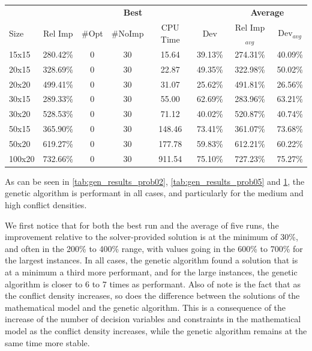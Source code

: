 \documentclass{mimosis}
\begin{document}
\begin{table}[h]
\begin{tabular}{lccccc|cc}
\multicolumn{1}{c}{} & \multicolumn{5}{c}{\textbf{Best}} & \multicolumn{2}{c}{\textbf{Average}} \\
\cmidrule(lr){2-6}\cmidrule(lr){7-8}
Size & Rel Imp & \#Opt & \#NoImp & CPU Time & Dev & Rel Imp$_{avg}$ & Dev$_{avg}$ \\
\hline
15x15 & 280.42\% & 0 & 30 & 15.64 & 39.13\% & 274.31\% & 40.09\% \\
20x15 & 328.69\% & 0 & 30 & 22.87 & 49.35\% & 322.98\% & 50.02\% \\
20x20 & 499.41\% & 0 & 30 & 31.07 & 25.62\% & 491.81\% & 26.56\% \\
30x15 & 289.33\% & 0 & 30 & 55.00 & 62.69\% & 283.96\% & 63.21\% \\
30x20 & 528.53\% & 0 & 30 & 71.12 & 40.02\% & 520.87\% & 40.74\% \\
50x15 & 365.90\% & 0 & 30 & 148.46 & 73.41\% & 361.07\% & 73.68\% \\
50x20 & 619.27\% & 0 & 30 & 177.78 & 59.83\% & 612.21\% & 60.22\% \\
100x20 & 732.66\% & 0 & 30 & 911.54 & 75.10\% & 727.23\% & 75.27\% \\
\end{tabular}
\label{tab:gen_results_prob08}
\end{table}

As can be seen in \cref{tab:gen_results_prob02}, \cref{tab:gen_results_prob05} and \cref{tab:gen_results_prob08}, the genetic algorithm is performant in all cases, and particularly for the medium and high conflict densities.

We first notice that for both the best run and the average of five runs, the improvement relative to the solver-provided solution is at the minimum of 30\%, and often in the 200\% to 400\% range, with values going in the 600\% to 700\% for the largest instances. In all cases, the genetic algorithm found a solution that is at a minimum a third more performant, and for the large instances, the genetic algorithm is closer to 6 to 7 times as performant. Also of note is the fact that as the conflict density increases, so does the difference between the solutions of the mathematical model and the genetic algorithm. This is a consequence of the increase of the number of decision variables and constraints in the mathematical model as the conflict density increases, while the genetic algorithm remains at the same time more stable. 
\end{document}
